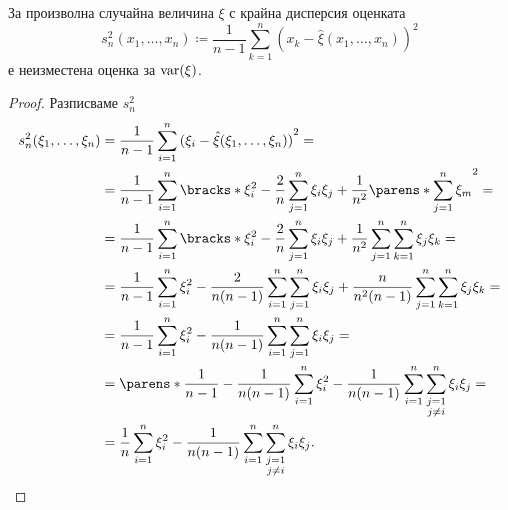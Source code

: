 \documentclass{../../common/topic}
\begin{document}
\begin{proposition}\label{thm:corrected_variation_is_unbiased_estimator}
  За произволна случайна величина \( \xi \) с крайна дисперсия оценката
  \begin{equation*}
    s_n^2(x_1, \ldots, x_n) \coloneqq \frac 1 {n-1} \sum_{k=1}^n {(x_k - \hat \xi(x_1, \ldots, x_n))}^2
  \end{equation*}
  е неизместена оценка за \( \operatorname{var}(\xi) \).
\end{proposition}
\begin{proof}
  Разписваме \( s_n^2 \)
  \begingroup
  \allowdisplaybreaks
  \begin{align*}
    s_n^2(\xi_1, \ldots, \xi_n)
    &=
    \frac 1 {n-1} \sum_{i=1}^n {(\xi_i - \hat \xi(\xi_1, \ldots, \xi_n))}^2
    = \\ &=
    \frac 1 {n-1} \sum_{i=1}^n \bracks*{\xi_i^2 - \frac 2 n \sum_{j=1}^n \xi_i \xi_j + \frac 1 {n^2} {\parens*{ \sum_{j=1}^n \xi_m }}^2 }
    = \\ &=
    \frac 1 {n-1} \sum_{i=1}^n \bracks*{\xi_i^2 - \frac 2 n \sum_{j=1}^n \xi_i \xi_j + \frac 1 {n^2} \sum_{j=1}^n \sum_{k=1}^n \xi_j \xi_k }
    = \\ &=
    \frac 1 {n-1} \sum_{i=1}^n \xi_i^2 - \frac 2 {n(n-1)} \sum_{i=1}^n \sum_{j=1}^n \xi_i \xi_j + \frac n {n^2 (n-1)} \sum_{j=1}^n \sum_{k=1}^n \xi_j \xi_k
    = \\ &=
    \frac 1 {n-1} \sum_{i=1}^n \xi_i^2 - \frac 1 {n(n-1)} \sum_{i=1}^n \sum_{j=1}^n \xi_i \xi_j
    = \\ &=
    \parens*{\frac 1 {n-1} - \frac 1 {n(n-1)} } \sum_{i=1}^n \xi_i^2 - \frac 1 {n(n-1)} \sum_{i=1}^n \sum_{\substack{j=1 \\ j\neq i}}^n \xi_i \xi_j
    = \\ &=
    \frac 1 n \sum_{i=1}^n \xi_i^2 - \frac 1 {n(n-1)} \sum_{i=1}^n \sum_{\substack{j=1 \\ j\neq i}}^n \xi_i \xi_j.
  \end{align*}
  \endgroup


\end{proof}
\end{document}

